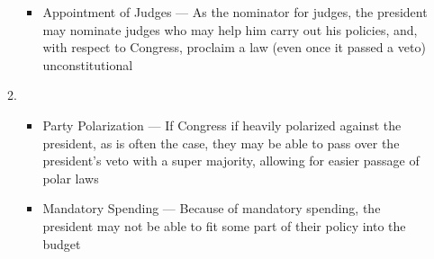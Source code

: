 \documentclass[12pt]{article}
\begin{document}
\begin{enumerate}
\begin{enumerate}
\begin{itemize}
          \item Appointment of Judges — As the nominator for judges, the president may nominate judges who may help him carry out his policies, and, with respect to Congress, proclaim a law (even once it passed a veto) unconstitutional

        \end{itemize}

      \item

        \begin{itemize}

          \item Party Polarization — If Congress if heavily polarized against the president, as is often the case, they may be able to pass over the president's veto with a super majority, allowing for easier passage of polar laws

          \item Mandatory Spending — Because of mandatory spending, the president may not be able to fit some part of their policy into the budget

        \end{itemize}

    \end{enumerate}

\end{enumerate}
\end{document}
